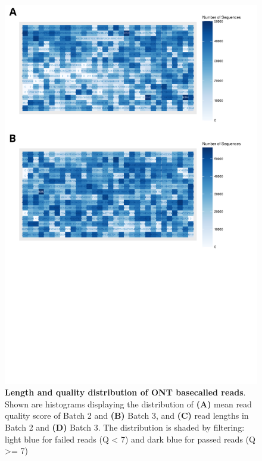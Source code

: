 \begin{figure}[]
	\begin{center}
		\includegraphics[page=3,trim={0 0cm 0cm 11cm},clip, scale = 0.45]{Figures/ONTTargetedTranscriptome.pdf}
	\end{center}
	\captionsetup{width=0.95\textwidth}
	\caption[ONT read length and quality from Whole Transcriptome Sequencing]%
	{\textbf{Length and quality distribution of ONT basecalled reads}. Shown are histograms displaying the distribution of \textbf{(A)} mean read quality score of Batch 2 and \textbf{(B)} Batch 3, and \textbf{(C)} read lengths in Batch 2 and \textbf{(D)} Batch 3. The distribution is shaded by filtering: light blue for failed reads (Q < 7) and dark blue for passed reads (Q >= 7) }
	\label{fig:ont_targetedlengthquality}
\end{figure}

